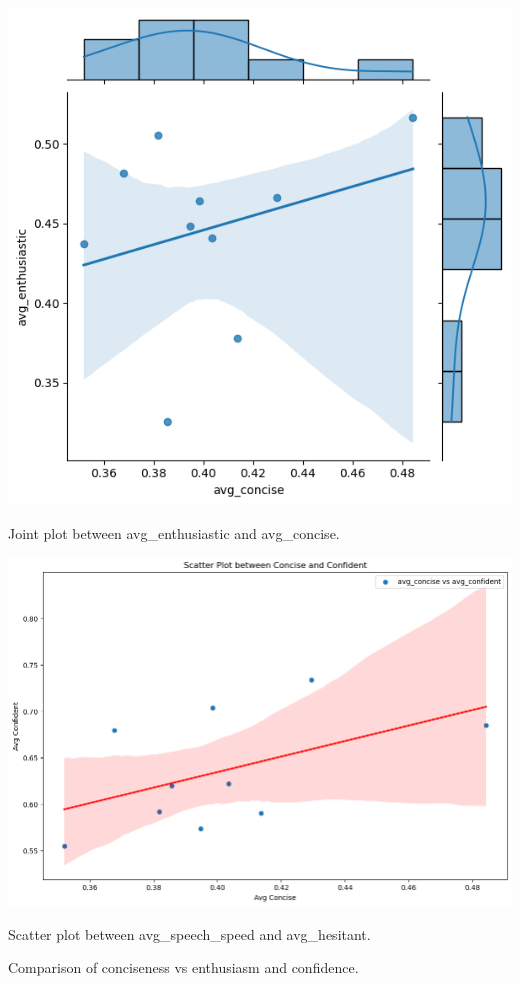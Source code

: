\documentclass{article}
\begin{document}
\begin{itemize}
    
    \begin{center}
        \begin{minipage}{0.45\textwidth}
        \centering
        \includegraphics[width=\textwidth]{images/joinplot_between_avg_enthusiatic_and_avg_concise.png}
        \caption{Joint plot between avg\_enthusiastic and avg\_concise.}
    \end{minipage}\hfill
    \begin{minipage}{0.45\textwidth}
        \centering
        \includegraphics[width=\textwidth]{images/concise_confi.png}
        \caption{Scatter plot between avg\_speech\_speed and avg\_hesitant.}
    \end{minipage}
    \caption{Comparison of conciseness vs enthusiasm and confidence.}
    \end{center}


\end{itemize}
\end{document}
